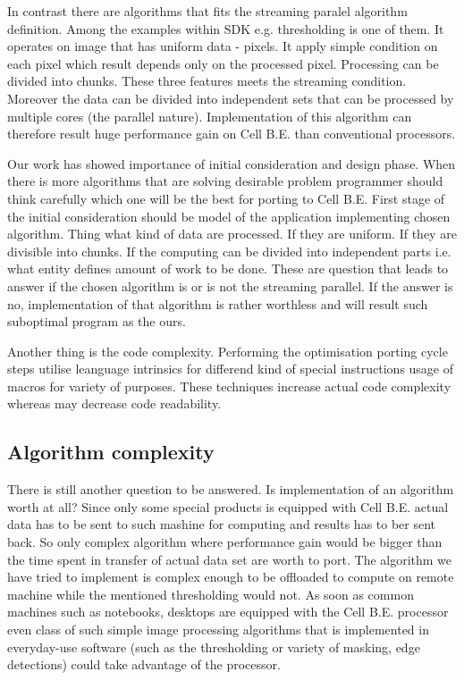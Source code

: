 \par
In contrast there are algorithms that fits the streaming paralel algorithm definition.
Among the examples within SDK e.g. thresholding is one of them.
It operates on image that has uniform data - pixels.
It apply simple condition on each pixel which result depends only on the processed pixel.
Processing can be divided into chunks.
These three features meets the streaming condition.
Moreover the data can be divided into independent sets that can be processed by multiple cores (the parallel nature).
Implementation of this algorithm can therefore result huge performance gain on Cell B.E. than conventional processors.

\par
Our work has showed importance of initial consideration and design phase.
When there is more algorithms that are solving desirable problem programmer should think carefully which one will be the best for porting to Cell B.E.
First stage of the initial consideration should be model of the application implementing chosen algorithm.
Thing what kind of data are processed.
If they are uniform.
If they are divisible into chunks.
If the computing can be divided into independent parts i.e. what entity defines amount of work to be done.
These are question that leads to answer if the chosen algorithm is or is not the streaming parallel.
If the answer is no, implementation of that algorithm is rather worthless and will result such suboptimal program as the ours.

\par
Another thing is the code complexity.
Performing the optimisation porting cycle steps utilise leanguage intrinsics for differend kind of special instructions usage of macros for variety of purposes.
These techniques increase actual code complexity whereas may decrease code readability.

\subsection{Algorithm complexity}

\par
There is still another question to be answered.
Is implementation of an algorithm worth at all?
Since only some special products is equipped with Cell B.E. actual data has to be sent to such mashine for computing and results has to ber sent back.
So only complex algorithm where performance gain would be bigger than the time spent in transfer of actual data set are worth to port.
The algorithm we have tried to implement is complex enough to be offloaded to compute on remote machine while the mentioned thresholding would not.
As soon as common machines such as notebooks, desktops are equipped with the Cell B.E. processor even class of such simple image processing algorithms that is implemented in everyday-use software (such as the thresholding or variety of masking, edge detections) could take advantage of the processor.

